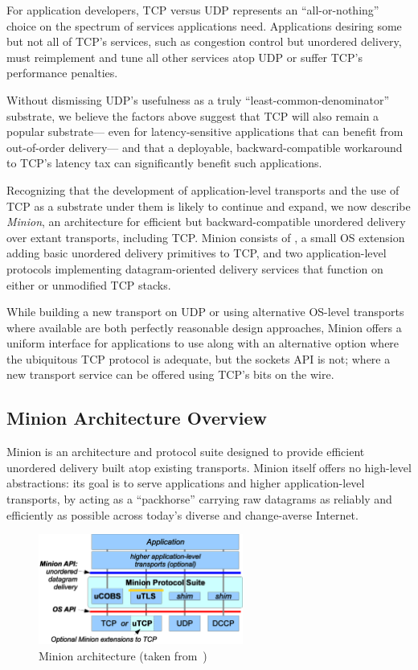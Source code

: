 For application developers,
TCP versus UDP represents an ``all-or-nothing'' choice
on the spectrum of services applications need.
Applications desiring some but not all of TCP's services,
such as congestion control but unordered delivery,
must reimplement and tune all other services atop UDP
or suffer TCP's performance penalties.

Without dismissing UDP's usefulness 
as a truly ``least-common-denominator'' substrate,
we believe the factors above
suggest that TCP will also remain a popular substrate---%
even for latency-sensitive applications
that can benefit from out-of-order delivery---%
and that a deployable, backward-compatible workaround
to TCP's latency tax
can significantly benefit such applications.

Recognizing that the development of application-level transports
and the use of TCP as a substrate under them
is likely to continue and expand,
we now describe {\em Minion},
an architecture for efficient but backward-compatible
unordered delivery over extant transports, including TCP.
Minion consists of
{\em \utcp},
a small OS extension
adding basic unordered delivery primitives to TCP,
and two application-level protocols
implementing datagram-oriented delivery services
that function on either \utcp or unmodified TCP stacks.

While building a new transport on UDP 
or using alternative OS-level transports where available
are both perfectly reasonable design approaches,
Minion offers a uniform interface for applications to use
along with an alternative option
where the ubiquitous TCP protocol is adequate, but the sockets API is not;
where a new transport service
can be offered using TCP's bits on the wire.

\subsection{Minion Architecture Overview}

Minion is an architecture and protocol suite
designed to provide efficient unordered delivery built atop
existing transports.
Minion itself offers no high-level abstractions:
its goal is to serve
applications and higher application-level transports,
by acting as a ``packhorse''
carrying raw datagrams as reliably and efficiently as possible
across today's diverse and change-averse Internet.

\begin{figure}[tbp]
\centering
\includegraphics[width=0.6\textwidth]{figures/minionarch.eps}
\caption{Minion architecture (taken from~\cite{nowlan12fitting})}
\label{f:minionarch}
\end{figure}

